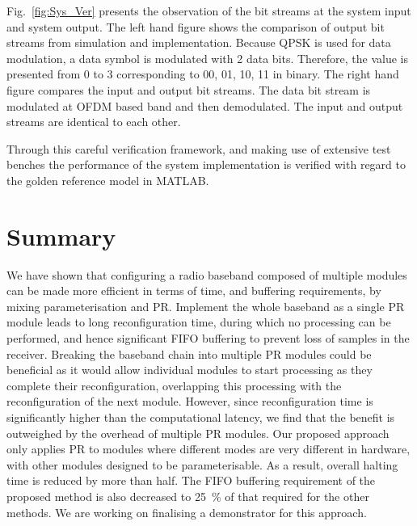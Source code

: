 Fig.~\ref{fig:Sys_Ver} presents the observation of the bit streams at the system input and system output. The left hand figure shows the comparison of output bit streams from simulation and implementation. Because QPSK is used for data modulation, a data symbol is modulated with 2 data bits. Therefore, the value is presented from 0 to 3 corresponding to 00, 01, 10, 11 in binary. The right hand figure compares the input and output bit streams. The data bit stream is modulated at OFDM based band and then demodulated. The input and output streams are identical to each other.
 
Through this careful verification framework, and making use of extensive test benches  the performance of the system implementation is verified with regard to the golden reference model in MATLAB.  

\section{Summary}
We have shown that configuring a radio baseband composed of multiple modules can be made more efficient in terms of time, and buffering requirements, by mixing parameterisation and PR.
Implement the whole baseband as a single PR module leads to long reconfiguration time, during which no processing can be performed, and hence significant FIFO buffering to prevent loss of samples in the receiver.
Breaking the baseband chain into multiple PR modules could be beneficial as it would allow individual modules to start processing as they complete their reconfiguration, overlapping this processing with the reconfiguration of the next module. However, since reconfiguration time is significantly higher than the computational latency, we find that the benefit is outweighed by the overhead of multiple PR modules.
Our proposed approach only applies PR to modules where different modes are very different in hardware, with other modules designed to be parameterisable. As a result, overall halting time is reduced by more than half.
The FIFO buffering requirement of the proposed method is also decreased to 25~\% of that required for the other methods.
We are working on finalising a demonstrator for this approach.